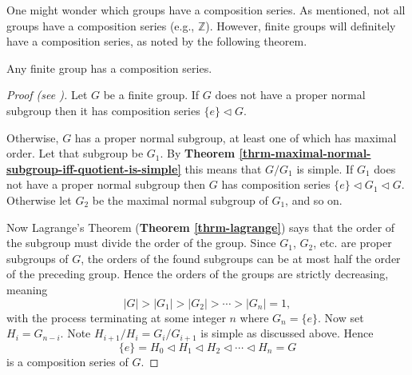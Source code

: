 One might wonder which groups have a composition series. As mentioned, not all groups have a composition series (e.g., $\mathbb{Z}$). However, finite groups will definitely have a composition series, as noted by the following theorem.
\begin{theorem}\label{thrm-finite-group-has-composition-series}
    Any finite group has a composition series.
\end{theorem}
\begin{proof}[Proof (see \cite{hungerford_1980, proofwiki_finitegrouphascompositionseries})]
    Let $G$ be a finite group. If $G$ does not have a proper normal subgroup then it has composition series $\{e\} \lhd G$.
    
    Otherwise, $G$ has a proper normal subgroup, at least one of which has maximal order. Let that subgroup be $G_1$. By \textbf{Theorem \ref{thrm-maximal-normal-subgroup-iff-quotient-is-simple}} this means that $G/G_1$ is simple. If $G_1$ does not have a proper normal subgroup then $G$ has composition series $\{e\} \lhd G_1 \lhd G$. Otherwise let $G_2$ be the maximal normal subgroup of $G_1$, and so on. 
    
    Now Lagrange's Theorem (\textbf{Theorem \ref{thrm-lagrange}}) says that the order of the subgroup must divide the order of the group. Since $G_1$, $G_2$, etc. are proper subgroups of $G$, the orders of the found subgroups can be at most half the order of the preceding group. Hence the orders of the groups are strictly decreasing, meaning
    \[
        |G| > |G_1| > |G_2| > \cdots > |G_n| = 1,
    \]
    with the process terminating at some integer $n$ where $G_n = \{e\}$. Now set $H_i = G_{n-i}$. Note $H_{i+1}/H_i = G_i/G_{i+1}$ is simple as discussed above. Hence
    \[
        \{e\} = H_0 \lhd H_1 \lhd H_2 \lhd \cdots \lhd H_n = G    
    \]
    is a composition series of $G$.
\end{proof}

\newpage

